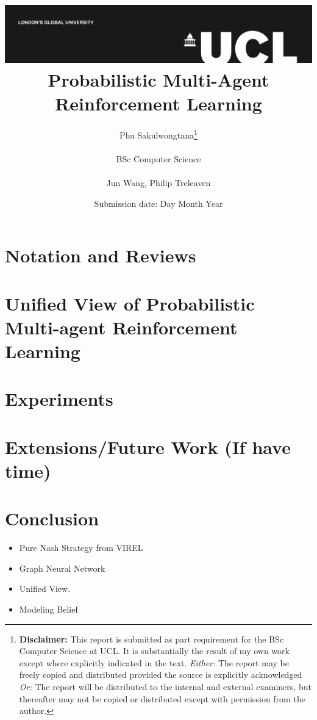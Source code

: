 \documentclass{report}
\title{{\vspace{-14em} \includegraphics[scale=0.4]{ucl_logo.png}}\\
{{\Huge Probabilistic Multi-Agent Reinforcement Learning}}\\
}
\date{Submission date: Day Month Year}
\author{Phu Sakulwongtana\thanks{
{\bf Disclaimer:}
This report is submitted as part requirement for the BSc Computer Science at UCL. It is
substantially the result of my own work except where explicitly indicated in the text.
\emph{Either:} The report may be freely copied and distributed provided the source is explicitly acknowledged
\newline  %
\emph{Or:}\newline
The report will be distributed to the internal and external examiners, but thereafter may not be copied or distributed except with permission from the author.}
\\ \\
BSc Computer Science\\ \\
Jun Wang, Philip Treleaven}
\begin{document}
 
\onehalfspacing
\maketitle
\begin{abstract}

\end{abstract}

\tableofcontents
\setcounter{page}{1}

\chapter{Notation and Reviews}


\chapter{Unified View of Probabilistic Multi-agent Reinforcement Learning}


% 

\chapter{Experiments}

\chapter{Extensions/Future Work (If have time)}


\chapter{Conclusion}
\begin{itemize}
    \item Pure Nash Strategy from VIREL
    \item Graph Neural Network 
    \item Unified View. 
    \item Modeling Belief 
\end{itemize}





% 

% 

% 
\end{document}
